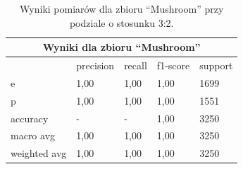 \begin{table}[h!]
        \centering
        \begin{tabular}{ |p{2cm}|p{2cm}|p{2cm}|p{2cm}|p{2cm}| }
                \hline
                \multicolumn{5}{|c|}{Wyniki dla zbioru ``Mushroom''} \\
                \hline
                 & precision & recall & f1-score & support \\
                \hline
                e & 1,00 & 1,00 & 1,00 & 1699 \\
                \hline
                p & 1,00 & 1,00 & 1,00 & 1551 \\
                \hline
                accuracy & - & - & 1,00 & 3250 \\
                \hline
                macro avg & 1,00 & 1,00 & 1,00 & 3250 \\
                \hline
                weighted avg & 1,00 & 1,00 & 1,00 & 3250 \\
                \hline
        \end{tabular}
        \caption{Wyniki pomiarów dla zbioru ``Mushroom'' przy podziale o stosunku 3:2.}
\end{table}



